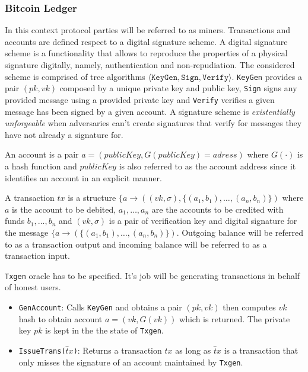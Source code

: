 \documentclass[..]{subfiles}
\begin{document}
\subsubsection{Bitcoin Ledger}

In this context protocol parties will be referred to as miners. Transactions and accounts are defined respect to a digital signature scheme. A digital signature scheme is a functionality that allows to reproduce the properties of a physical signature digitally, namely, authentication and non-repudiation. The considered scheme is comprised of tree algorithms $\langle \texttt{KeyGen}, \texttt{Sign}, \texttt{Verify} \rangle$. \texttt{KeyGen} provides a pair $(pk, vk)$ composed by a unique private key and public key, \texttt{Sign} signs any provided message using a provided private key and \texttt{Verify} verifies a given message has been signed by a given account. A signature scheme is \textit{existentially unforgeable} when adversaries can't create signatures that verify for messages they have not already a signature for.

An account is a pair $a = (publicKey, G(publicKey)=adress)$ where $G(\cdot)$ is a hash function and $publicKey$ is also referred to as the account address since it identifies an account in an explicit manner.

A transaction $tx$ is a structure $\{a \rightarrow ((vk, \sigma), \{ (a_1, b_1), \dots , (a_n, b_n) \})$ where $a$ is the account to be debited, $a_1, \dots, a_n$ are the accounts to be credited with funds $b_1, \dots, b_n$ and $(vk, \sigma)$ is a pair of verification key and digital signature for the message $\{a \rightarrow (\{ (a_1, b_1), \dots , (a_n, b_n) \})$. Outgoing balance will be referred to as a transaction output and incoming balance will be referred to as a transaction input.

\texttt{Txgen} oracle has to be specified. It's job will be generating transactions in behalf of honest users.
\begin{itemize}
	\item \texttt{GenAccount}: Calls \texttt{KeyGen} and obtains a pair $(pk, vk)$ then computes $vk$ hash to obtain account $a = (vk, G(vk))$ which is returned. The private key $pk$ is kept in the the state of \texttt{Txgen}.
	\item \texttt{IssueTrans($\hat tx$)}: Returns a transaction $tx$ as long as $\hat tx$ is a transaction that only misses the signature of an account maintained by \texttt{Txgen}.
\end{itemize}
\end{document}
